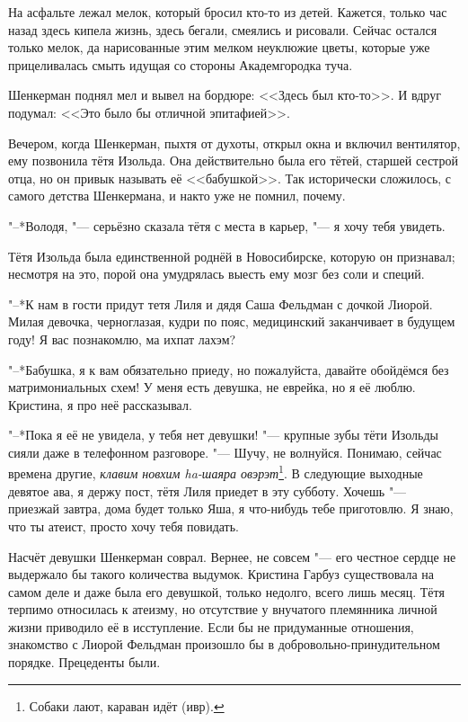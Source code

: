 На асфальте лежал мелок, который бросил кто-то из детей.
Кажется, только час назад здесь кипела жизнь, здесь бегали, смеялись и рисовали.
Сейчас остался только мелок, да нарисованные этим мелком неуклюжие цветы, которые уже прицеливалась смыть идущая со стороны Академгородка туча.

Шенкерман поднял мел и вывел на бордюре: <<Здесь был кто-то>>.
И вдруг подумал: <<Это было бы отличной эпитафией>>.

\asterism

\label{Thu_2012_07_19}

Вечером, когда Шенкерман, пыхтя от духоты, открыл окна и включил вентилятор, ему позвонила тётя Изольда.
Она действительно была его тётей, старшей сестрой отца, но он привык называть её <<бабушкой>>.
Так исторически сложилось, с самого детства Шенкермана, и накто уже не помнил, почему.

"--*Володя, "--- серьёзно сказала тётя с места в карьер, "--- я хочу тебя увидеть.

Тётя Изольда была единственной роднёй в Новосибирске, которую он признавал;
несмотря на это, порой она умудрялась выесть ему мозг без соли и специй.

"--*К нам в гости придут тетя Лиля и дядя Саша Фельдман с дочкой Лиорой.
Милая девочка, черноглазая, кудри по пояс, медицинский заканчивает в будущем году!
Я вас познакомлю, ма ихпат лахэм?

"--*Бабушка, я к вам обязательно приеду, но пожалуйста, давайте обойдёмся без матримониальных схем!
У меня есть девушка, не еврейка, но я её люблю.
Кристина, я про неё рассказывал.

"--*Пока я её не увидела, у тебя нет девушки! "--- крупные зубы тёти Изольды сияли даже в телефонном разговоре.
"--- Шучу, не волнуйся.
Понимаю, сейчас времена другие, \textit{клавим новхим ha-шаяра овэрэт}\footnote{Собаки лают, караван идёт (ивр).}.
В следующие выходные девятое ава, я держу пост, тётя Лиля приедет в эту субботу.
Хочешь "--- приезжай завтра, дома будет только Яша, я что-нибудь тебе приготовлю.
Я знаю, что ты атеист, просто хочу тебя повидать.

Насчёт девушки Шенкерман соврал.
Вернее, не совсем "--- его честное сердце не выдержало бы такого количества выдумок.
Кристина Гарбуз существовала на самом деле и даже была его девушкой, только недолго, всего лишь месяц.
Тётя терпимо относилась к атеизму, но отсутствие у внучатого племянника личной жизни приводило её в исступление.
Если бы не придуманные отношения, знакомство с Лиорой Фельдман произошло бы в добровольно-принудительном порядке.
Прецеденты были.

